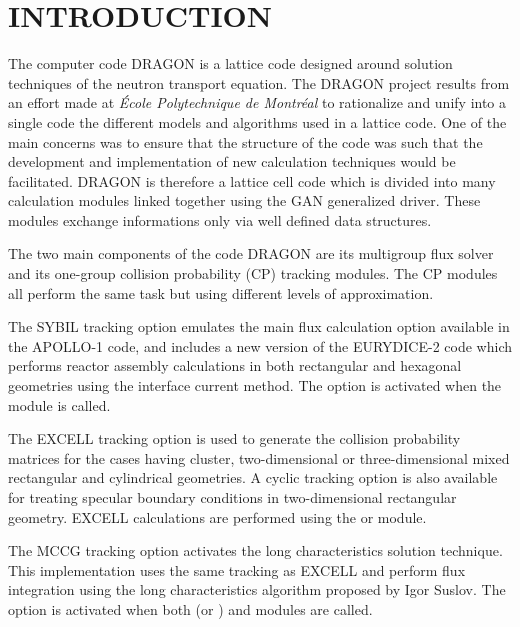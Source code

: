 \section{INTRODUCTION}\label{sect:Introduction}

The computer code DRAGON is a lattice code designed around solution techniques of 
the neutron transport equation.\cite{PIP2009} The DRAGON project results from an effort made at
{\sl \'Ecole Polytechnique de Montr\'eal} to rationalize and unify into a single code
the different models and algorithms used in a lattice code.\cite{Dragon1,Dragon2,Dragon3,Dragon4}
One of the main concerns was to ensure
that the structure of the code was such that the development and implementation
of new calculation techniques would be facilitated. DRAGON is therefore a
lattice cell code which is divided into many calculation modules linked together
using the GAN generalized driver\cite{utilitaire,cle2000}. These modules exchange
informations only via well defined data structures.

The two main components of the code DRAGON are its multigroup flux solver and
its one-group collision probability (CP) tracking modules. The CP modules  all
perform the same task but using different levels of approximation.

The SYBIL tracking option emulates the main flux calculation option available in
the APOLLO-1 code,\cite{Apollo,SPH} and includes a new version of the
EURYDICE-2 code which performs reactor assembly calculations in both rectangular
and hexagonal geometries using the interface current method. The option
is activated when the  module is called.

The EXCELL tracking option is used to generate the collision probability
matrices for the cases having cluster, two-dimensional or three-dimensional
mixed rectangular and cylindrical geometries.\cite{DragonPIJI,Mtl93a} A cyclic
tracking option is also available for treating specular boundary conditions in
two-dimensional rectangular geometry.\cite{DragonPIJS1,Mtl93b} EXCELL
calculations are performed using the  or  module.

The MCCG tracking option activates the long characteristics solution technique.
This implementation uses the same tracking as EXCELL and perform flux
integration using the long characteristics algorithm proposed by Igor
Suslov.\cite{mccg,suslov2,chicago2} The option
is activated when both  (or ) and  modules are called.

